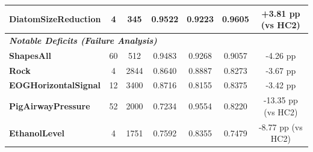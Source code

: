 \begin{table}[t]
\begin{tabular}{lcccccc}
\textbf{DiatomSizeReduction} & 4 & 345 & 0.9522 & 0.9223 & \textbf{0.9605} & +3.81 pp (vs HC2) \\
\midrule
\multicolumn{7}{l}{\textit{\textbf{Notable Deficits (Failure Analysis)}}} \\
\textbf{ShapesAll} & 60 & 512 & 0.9483 & 0.9268 & 0.9057 & -4.26 pp \\
\textbf{Rock} & 4 & 2844 & 0.8640 & 0.8887 & 0.8273 & -3.67 pp \\
\textbf{EOGHorizontalSignal} & 12 & 3400 & 0.8716 & 0.8155 & 0.8375 & -3.42 pp \\
\textbf{PigAirwayPressure} & 52 & 2000 & 0.7234 & 0.9554 & 0.8220 & -13.35 pp (vs HC2) \\
\textbf{EthanolLevel} & 4 & 1751 & 0.7592 & 0.8355 & 0.7479 & -8.77 pp (vs HC2) \\
\bottomrule
\end{tabular}
\end{table}
